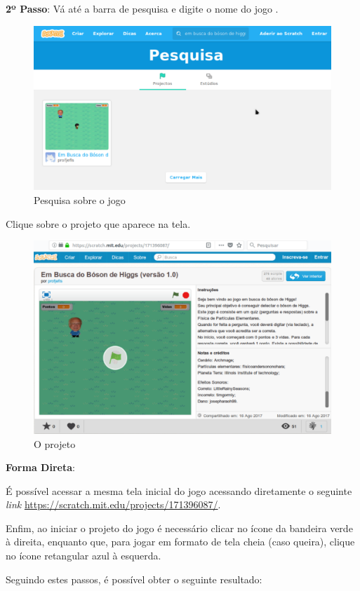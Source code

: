 \documentclass[12pt,fleqn]{book} %
\begin{document}
\textbf{2º Passo}: Vá até a barra de pesquisa e digite o nome do jogo . 


\begin{figure}[h]
	\centering
	\includegraphics[width=0.7 \textwidth]{Produto/pesquisa}
	\caption{Pesquisa sobre o jogo}
	\label{fig:app_pesquisa}
\end{figure}

\newpage

Clique sobre o projeto que aparece na tela.

\begin{figure}[h]
	\centering
	\includegraphics[width=0.7 \textwidth]{Produto/site_jogo}
	\caption{O projeto}
	\label{fig:app_a:projeto}
\end{figure}

\textbf{Forma Direta}:

É possível acessar a mesma tela inicial do jogo acessando diretamente o seguinte \textit{link} \url{https://scratch.mit.edu/projects/171396087/}.

Enfim, ao iniciar o projeto do jogo é necessário clicar no ícone da bandeira verde à direita, enquanto que, para jogar em formato de tela cheia (caso queira), clique no ícone retangular azul à esquerda.

Seguindo estes passos, é possível obter o seguinte resultado:
\end{document}
